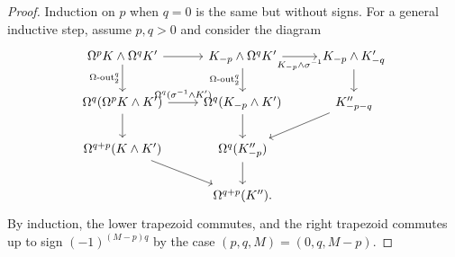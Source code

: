 \documentclass{amsart}
\theoremstyle{definition}
\newcommand{\ooutk}[1]{\operatorname{\Omega-out}^{#1}}
\begin{document}
\begin{proof}
    Induction on $p$ when $q = 0$ is the same but without signs. For a general inductive step, assume $p,q>0$ and consider the diagram
    \[\begin{tikzcd}
    	{\Omega^{p}  K \wedge \Omega^q  K'} & {K_{-p} \wedge \Omega^qK'_{}} & {K_{-p} \wedge K'_{-q}} \\
    	{\Omega^{q} (\Omega^p K \wedge K')} & {\Omega^{q} (K_{-p} \wedge K'_{})} & {K''_{-p-q}} \\
    	{\Omega^{q+p} (K \wedge K')} & {\Omega^{q} (K''_{-p})} \\
    	& {\Omega^{q+p} (K'').}
    	\arrow[from=1-1, to=1-2]
    	\arrow["{\ooutk{q}_2}"', from=1-1, to=2-1]
    	\arrow["{K_{-p}\wedge \sigma^{-1}}"', from=1-2, to=1-3]
    	\arrow["{\ooutk{q}_2}"', from=1-2, to=2-2]
    	\arrow[from=1-3, to=2-3]
    	\arrow["{\Omega^q ( \sigma^{-1} \wedge K')}", from=2-1, to=2-2]
    	\arrow[from=2-1, to=3-1]
    	\arrow[from=2-2, to=3-2]
    	\arrow[from=2-3, to=3-2]
    	\arrow[from=3-1, to=4-2]
    	\arrow[from=3-2, to=4-2]
    \end{tikzcd}\]
    By induction, the lower trapezoid commutes, and the right trapezoid commutes up to sign $(-1)^{(M-p)q}$ by the case $(p,q, M) = (0,q, M-p)$.
\end{proof}
\end{document}
